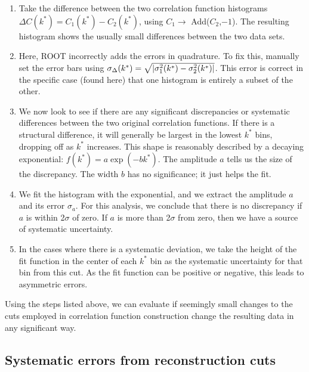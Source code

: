 \begin{enumerate}
\item Take the difference between the two correlation function histograms $\Delta C(k^*) = C_1(k^*) - C_2(k^*)$, using $C_1\rightarrow$ Add($C_2$,$-1$).  
The resulting histogram shows the usually small differences between the two data sets.
\item Here, ROOT incorrectly adds the errors in quadrature.  
To fix this, manually set the error bars using $\sigma_{\Delta}(k^*) = \sqrt{ \left\lvert \sigma_1^2(k^*) - \sigma_2^2(k^*) \right\rvert}$.  
This error is correct in the specific case (found here) that one histogram is entirely a subset of the other.
\item We now look to see if there are any significant discrepancies or systematic differences between the two original correlation functions.
If there is a structural difference, it will generally be largest in the lowest $k^*$ bins, dropping off as $k^*$ increases.
This shape is reasonably described by a decaying exponential: $f(k^*) = a \exp(-b k^*)$. 
The amplitude $a$ tells us the size of the discrepancy. The width $b$ has no significance; it just helps the fit.
\item We fit the histogram with the exponential, and we extract the amplitude $a$ and its error $\sigma_a$.
For this analysis, we conclude that there is no discrepancy if $a$ is within 2$\sigma$ of zero.
If $a$ is more than 2$\sigma$ from zero, then we have a source of systematic uncertainty.
\item In the cases where there is a systematic deviation, we take the height of the fit function in the center of each $k^*$ bin as the systematic uncertainty for that bin from this cut.
As the fit function can be positive or negative, this leads to asymmetric errors.

\end{enumerate}

Using the steps listed above, we can evaluate if seemingly small changes to the cuts employed in correlation function construction change the resulting data in any significant way.  


\subsection{Systematic errors from reconstruction cuts}
\label{sec:SystematicsReconstruction}

